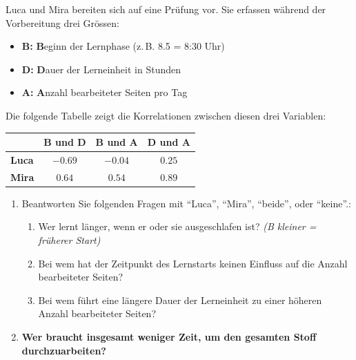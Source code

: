 \begin{myexercise}
    Luca und Mira bereiten sich auf eine Prüfung vor. Sie erfassen während der Vorbereitung drei Grössen:
    \begin{itemize}
        \item \textbf{B:} \textbf{B}eginn der Lernphase (z.\,B. 8.5 = 8:30 Uhr)
        \item \textbf{D:} \textbf{D}auer der Lerneinheit in Stunden
        \item \textbf{A:} \textbf{A}nzahl bearbeiteter Seiten pro Tag
    \end{itemize}
    Die folgende Tabelle zeigt die Korrelationen zwischen diesen drei Variablen:

    \begin{table}[H]
        \centering
        \begin{tabular}{l||c|c|c}

                          & \textbf{B und D} & \textbf{B und A} & \textbf{D und A} \\
            \midrule\midrule
            \textbf{Luca} & $-0.69$          & $-0.04$          & $0.25$           \\\midrule
            \textbf{Mira} & $0.64$           & $0.54$           & $0.89$           \\
        \end{tabular}
    \end{table}

    \begin{enumerate}
        \item Beantworten Sie folgenden Fragen mit \enquote{Luca}, \enquote{Mira}, \enquote{beide}, oder \enquote{keine}.:
              \begin{enumerate}
                  \item Wer lernt länger, wenn er oder sie ausgeschlafen ist? \hfill \textit{(B kleiner = früherer Start)}
                  \item Bei wem hat der Zeitpunkt des Lernstarts keinen Einfluss auf die Anzahl bearbeiteter Seiten?
                  \item Bei wem führt eine längere Dauer der Lerneinheit zu einer höheren Anzahl bearbeiteter Seiten?
              \end{enumerate}
        \item \textbf{Wer braucht insgesamt weniger Zeit, um den gesamten Stoff durchzuarbeiten?}
    \end{enumerate}


\end{myexercise}
